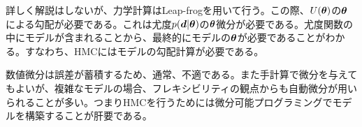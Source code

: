 詳しく解説はしないが、力学計算はLeap-frogを用いて行う。この際、$U(\boldsymbol{\theta})$の$\boldsymbol{\theta}$による勾配が必要である。これは尤度$p(\boldsymbol{d}|\boldsymbol{\theta})$の$\boldsymbol{\theta}$微分が必要である。尤度関数の中にモデルが含まれることから、最終的にモデルの$\boldsymbol{\theta}$が必要であることがわかる。すなわち、HMCにはモデルの勾配計算が必要である。

数値微分は誤差が蓄積するため、通常、不適である。また手計算で微分を与えてもよいが、複雑なモデルの場合、フレキシビリティの観点からも自動微分が用いられることが多い。つまりHMCを行うためには微分可能プログラミングでモデルを構築することが肝要である。

